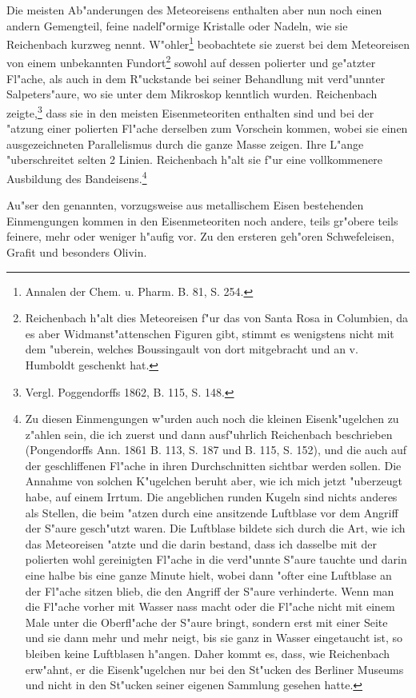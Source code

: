 \documentclass[a4paper, 11pt, oneside]{article}
\begin{document}
Die meisten Ab"anderungen des Meteoreisens enthalten aber nun noch einen andern Gemengteil, feine nadelf"ormige Kristalle oder Nadeln, wie sie Reichenbach kurzweg nennt. W"ohler\footnote{Annalen der Chem. u. Pharm. B. 81, S. 254.} beobachtete sie zuerst bei dem Meteoreisen von einem unbekannten Fundort\footnote{Reichenbach h"alt dies Meteoreisen f"ur das von Santa Rosa in Columbien, da es aber Widmanst"attenschen Figuren gibt, stimmt es wenigstens nicht mit dem "uberein, welches Boussingault von dort mitgebracht und an v. Humboldt geschenkt hat.} sowohl auf dessen polierter und ge"atzter Fl"ache, als auch in dem R"uckstande bei seiner Behandlung mit verd"unnter Salpeters"aure, wo sie unter dem Mikroskop kenntlich wurden. Reichenbach zeigte,\footnote{Vergl. Poggendorffs 1862, B. 115, S. 148.} dass sie in den meisten Eisenmeteoriten enthalten sind und bei der "atzung einer polierten Fl"ache derselben zum Vorschein kommen, wobei sie einen ausgezeichneten Parallelismus durch die ganze Masse zeigen. Ihre L"ange "uberschreitet selten 2 Linien. Reichenbach h"alt sie f"ur eine vollkommenere Ausbildung des Bandeisens.\footnote{Zu diesen Einmengungen w"urden auch noch die kleinen Eisenk"ugelchen zu z"ahlen sein, die ich zuerst und dann ausf"uhrlich Reichenbach beschrieben (Pongendorffs Ann. 1861 B. 113, S. 187 und B. 115, S. 152), und die auch auf der geschliffenen Fl"ache in ihren Durchschnitten sichtbar werden sollen. Die Annahme von solchen K"ugelchen beruht aber, wie ich mich jetzt "uberzeugt habe, auf einem Irrtum. Die angeblichen runden Kugeln sind nichts anderes als Stellen, die beim "atzen durch eine ansitzende Luftblase vor dem Angriff der S"aure gesch"utzt waren. Die Luftblase bildete sich durch die Art, wie ich das Meteoreisen "atzte und die darin bestand, dass ich dasselbe mit der polierten wohl gereinigten Fl"ache in die verd"unnte S"aure tauchte und darin eine halbe bis eine ganze Minute hielt, wobei dann "ofter eine Luftblase an der Fl"ache sitzen blieb, die den Angriff der S"aure verhinderte. Wenn man die Fl"ache vorher mit Wasser nass macht oder die Fl"ache nicht mit einem Male unter die Oberfl"ache der S"aure bringt, sondern erst mit einer Seite und sie dann mehr und mehr neigt, bis sie ganz in Wasser eingetaucht ist, so bleiben keine Luftblasen h"angen. Daher kommt es, dass, wie Reichenbach erw"ahnt, er die Eisenk"ugelchen nur bei den St"ucken des Berliner Museums und nicht in den St"ucken seiner eigenen Sammlung gesehen hatte.}

Au"ser den genannten, vorzugsweise aus metallischem Eisen bestehenden Einmengungen kommen in den Eisenmeteoriten noch andere, teils gr"obere teils feinere, mehr oder weniger h"aufig vor. Zu den ersteren geh"oren Schwefeleisen, Grafit und besonders Olivin.
\end{document}
